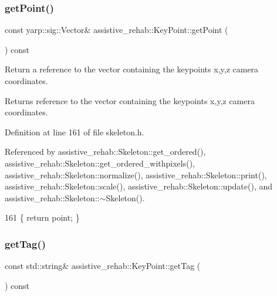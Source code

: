 \subsubsection{\texorpdfstring{get\+Point()}{getPoint()}}
{\footnotesize\ttfamily const yarp\+::sig\+::\+Vector\& assistive\+\_\+rehab\+::\+Key\+Point\+::get\+Point (\begin{DoxyParamCaption}{ }\end{DoxyParamCaption}) const\hspace{0.3cm}{\ttfamily [inline]}}



Return a reference to the vector containing the keypoint\textquotesingle{}s x,y,z camera coordinates. 

\begin{DoxyReturn}{Returns}
reference to the vector containing the keypoint\textquotesingle{}s x,y,z camera coordinates. 
\end{DoxyReturn}


Definition at line 161 of file skeleton.\+h.



Referenced by assistive\+\_\+rehab\+::\+Skeleton\+::get\+\_\+ordered(), assistive\+\_\+rehab\+::\+Skeleton\+::get\+\_\+ordered\+\_\+withpixels(), assistive\+\_\+rehab\+::\+Skeleton\+::normalize(), assistive\+\_\+rehab\+::\+Skeleton\+::print(), assistive\+\_\+rehab\+::\+Skeleton\+::scale(), assistive\+\_\+rehab\+::\+Skeleton\+::update(), and assistive\+\_\+rehab\+::\+Skeleton\+::$\sim$\+Skeleton().


\begin{DoxyCode}
161 \{ \textcolor{keywordflow}{return} point; \}
\end{DoxyCode}
\mbox{\label{classassistive__rehab_1_1KeyPoint_ace24db46297c42bee32acd87d7450dcd}} 
\subsubsection{\texorpdfstring{get\+Tag()}{getTag()}}
{\footnotesize\ttfamily const std\+::string\& assistive\+\_\+rehab\+::\+Key\+Point\+::get\+Tag (\begin{DoxyParamCaption}{ }\end{DoxyParamCaption}) const\hspace{0.3cm}{\ttfamily [inline]}}



